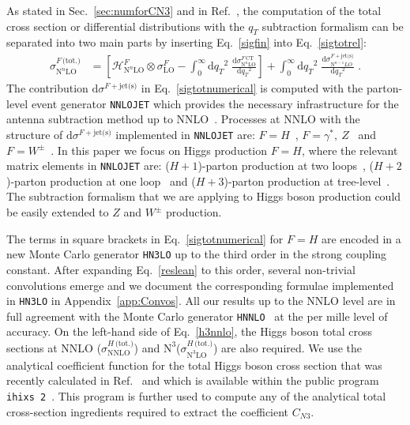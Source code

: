\documentclass[12pt]{article}
\DeclareRobustCommand{\qt}{\ensuremath{q_T}\xspace}
\DeclareRobustCommand{\rd}{\ensuremath{\mathrm{d}}}
\DeclareRobustCommand{\cH}{\ensuremath{\mathcal{H}}}
\DeclareRobustCommand{\jets}{\text{jet(s)}\xspace}
\DeclareRobustCommand{\CT}{\text{CT}\xspace}
\DeclareRobustCommand{\tot}{\text{(tot.)}\xspace}
\DeclareRobustCommand{\LO}{\text{LO}\xspace}
\DeclareRobustCommand{\NNLO}{\text{NNLO}\xspace}
\DeclareRobustCommand{\N}[1]{\ensuremath{\text{N}^{#1}}} %
\begin{document}
As stated in Sec.~\ref{sec:numforCN3} and in Ref.~\cite{Catani:2007vq}, the computation of the total cross section or differential distributions with the  $\qt$ subtraction formalism can be separated into two main parts by inserting Eq.~\eqref{sigfin} into Eq.~\eqref{sigtotrel}:
\begin{align}
  \sigma^{F\,\tot}_{\N{n}\LO}
  &=
  \left[
    \cH^F_{\N{n}\LO} \otimes \sigma^F_{\LO}
    - \int_0^\infty\rd\qt^2 \; \frac{\rd\sigma^{F\,\CT}_{\N{n}\LO}}{\rd\qt^2} 
  \right]
  + \int_0^\infty\rd\qt^2 \; \frac{\rd\sigma^{F+\jets}_{\N{n-1}LO}}{\rd\qt^2} \;.
  \label{sigtotnumerical} 
\end{align}
The contribution $\rd{\sigma}^{F+\jets}$ in Eq.~\eqref{sigtotnumerical} is computed with the parton-level event generator \texttt{NNLOJET} which provides the necessary infrastructure for the antenna subtraction method up to NNLO~\cite{Antenna:method}. 
Processes at NNLO with the structure of $\rd{\sigma}^{F+\jets}$ implemented in \texttt{NNLOJET} are: $F=H$~\cite{Chen:2016zka}, $F=\gamma^*,~Z$~\cite{Ridder:2015dxa,Gehrmann-DeRidder:2016jns} and $F=W^{\pm}$~\cite{Gehrmann-DeRidder:2017mvr}. In this paper we focus on Higgs production $F=H$, where the relevant matrix elements in 
 \texttt{NNLOJET} are: ($H+1$)-parton production at two loops~\cite{Gehrmann:2011aa}, ($H+2$)-parton production at one loop~\cite{Dixon:2009uk,Badger:2009hw,Badger:2009vh} and ($H+3$)-parton 
 production at tree-level~\cite{DelDuca:2004wt,Dixon:2004za,Badger:2004ty}. The subtraction formalism that we are applying to Higgs boson production could be easily extended  to $Z$ and $W^{\pm}$ production. 

The terms in square brackets in Eq.~\eqref{sigtotnumerical}  for $F=H$ are encoded in a new Monte Carlo generator \texttt{HN3LO} up to the third order in the strong coupling constant. After expanding Eq.~\eqref{reslean} to this order, several non-trivial convolutions emerge and we document the corresponding formulae implemented in \texttt{HN3LO} in Appendix~\ref{app:Convos}. All our results up to the NNLO level are in full agreement with the Monte Carlo generator \texttt{HNNLO}~\cite{Catani:2007vq} at the per mille level of accuracy. On the left-hand side of Eq.~\eqref{h3nnlo}, the Higgs boson total cross sections at NNLO ($\sigma^{H\,\tot}_{\NNLO}$) and \N3\LO  ($\sigma^{H\,\tot}_{\N{3}\LO}$) are also required. 
We use the analytical coefficient function for the total Higgs boson cross section that was recently calculated in Ref.~\cite{Mistlberger:2018etf} and which is available within the public program \texttt{ihixs 2}~\cite{Dulat:2018rbf}.
This program is further used to compute any of the analytical total cross-section ingredients required to extract the coefficient $C_{N3}$.
\end{document}
